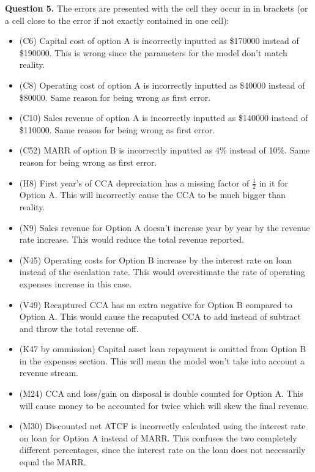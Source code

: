 \documentclass[letterpaper, reqno,11pt]{article}
\begin{document}
\medskip

{\noindent\bf Question 5.} The errors are presented with the cell they occur in in brackets (or a cell close to the error if not exactly contained in one cell): 

\begin{itemize}
    \item{(C6) Capital cost of option A is incorrectly inputted as \$170000 instead of \$190000. This is wrong since the parameters for the model don't match reality. }
    \item{(C8) Operating cost of option A is incorrectly inputted as \$40000 instead of \$80000. Same reason for being wrong as first error. }
    \item{(C10) Sales revenue of option A is incorrectly inputted as \$140000 instead of \$110000. Same reason for being wrong as first error. }
    \item{(C52) MARR of option B is incorrectly inputted as 4\% instead of 10\%. Same reason for being wrong as first error. }
    \item{(H8) First year's of CCA depreciation has a missing factor of $\frac{1}{2}$ in it for Option A. This will incorrectly cause the CCA to be much bigger than reality. }
    \item{(N9) Sales revenue for Option A doesn't increase year by year by the revenue rate increase. This would reduce the total revenue reported. }
    \item{(N45) Operating costs for Option B increase by the interest rate on loan instead of the escalation rate. This would overestimate the rate of operating expenses increase in this case. }
    \item{(V49) Recaptured CCA has an extra negative for Option B compared to Option A. This would cause the recaputed CCA to add instead of subtract and throw the total revenue off. }
    \item{(K47 by ommission) Capital asset loan repayment is omitted from Option B in the expenses section. This will mean the model won't take into account a revenue stream. }
    \item{(M24) CCA and loss/gain on disposal is double counted for Option A. This will cause money to be accounted for twice which will skew the final revenue. }
    \item{(M30) Discounted net ATCF is incorrectly calculated using the interest rate on loan for Option A instead of MARR. This confuses the two completely different percentages, since the interest rate on the loan does not necessarily equal the MARR. }

\end{itemize}
\end{document}
